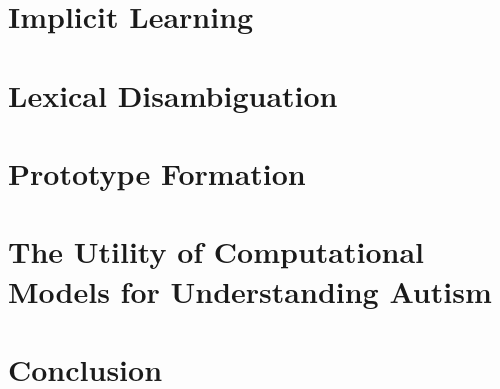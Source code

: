 \documentclass[]{book}
\begin{document}
% 
% 


\section{Implicit Learning}
\label{section:implicit}




\section{Lexical Disambiguation}
\label{section:lexical}




\section{Prototype Formation}
\label{section:prototype}




% 
% 


\section{The Utility of Computational Models for Understanding Autism}
\label{section:modeling}




\section{Conclusion}
\label{section:conclusion}




% 



\backmatter
\end{document}
